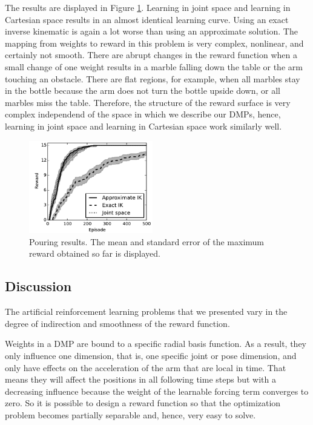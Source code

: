 \documentclass{article}
\begin{document}

The results are displayed in Figure \ref{fig:pouring_res}.
Learning in joint space and learning in Cartesian space results in an
almost identical learning curve. Using an exact inverse kinematic
is again a lot worse than using an approximate solution.
The mapping from weights to reward in this problem is very complex,
nonlinear, and certainly not smooth. There are abrupt changes in
the reward function when a small change of one weight results in
a marble falling down the table or the arm touching an obstacle.
There are flat regions, for example, when all marbles stay
in the bottle because the arm does not turn the bottle upside down,
or all marbles miss the table. Therefore, the structure of the
reward surface is very complex independend of the space in which
we describe our DMPs, hence, learning in joint space and learning
in Cartesian space work similarly well.

\begin{figure}
\includegraphics[width=0.48\textwidth]{result_comparison_pouring}
\centering
\caption{
Pouring results. The mean and standard error of the maximum reward
obtained so far is displayed.
}
\label{fig:pouring_res}
\end{figure}

\subsection{Discussion}


The artificial reinforcement learning problems that we presented vary in
the degree of indirection and smoothness of the reward function.

Weights in a DMP are bound to a specific radial basis function. As a result,
they only influence one dimension, that is, one specific joint or pose
dimension, and only have effects on the acceleration of the arm that are
local in time. That means they will affect the positions in all following
time steps but with a decreasing influence because the weight of the
learnable forcing term converges to zero.
So it is possible to design a reward function so that the optimization
problem becomes partially separable and, hence, very easy to solve.
\end{document}
